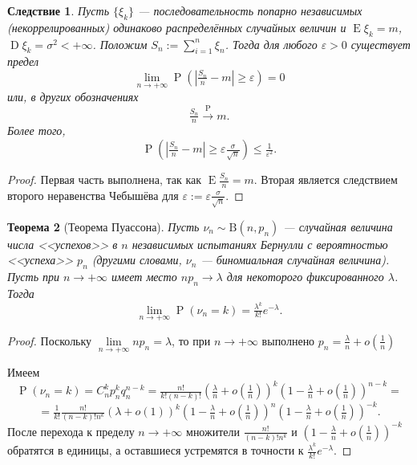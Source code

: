 \documentclass[12pt]{article}
\newtheorem{theorem}{Теорема}
\newtheorem{corollary}[theorem]{Следствие}
\numberwithin{theorem}{section}
\theoremstyle{definition}
\newcommand{\prob}{\operatorname{P}}
\newcommand{\expect}{\operatorname{E}}
\newcommand{\disp}{\operatorname{D}}
\begin{document}
	\begin{corollary}
		Пусть $ \{\xi_k\} $ --- последовательность попарно независимых (некоррелированных)
		одинаково распределённых случайных величин и $ \expect\xi_k = m $,
		$ \disp\xi_k = \sigma^2 < +\infty $. Положим $ S_n := \sum\limits_{i = 1}^{n} \xi_n $.
		Тогда для любого $ \varepsilon > 0 $ существует предел
		$$ \lim\limits_{n \to +\infty} \prob(|\tfrac{S_n}{n} - m| \geqslant \varepsilon) = 0 $$ 
		или, в других обозначениях 
		$$ \tfrac{S_n}{n} \overset{\prob}{\to} m. $$
		Более того,
		$$ \prob(|\tfrac{S_n}{n} - m| \geqslant \varepsilon\tfrac{\sigma}{\sqrt{n}}) \leqslant \tfrac{1}{\varepsilon^2}. $$
	\end{corollary}
	
	\begin{proof}
		Первая часть выполнена, так как $ \expect\tfrac{S_n}{n} = m $.
		Вторая является следствием второго неравенства Чебышёва
		для $ \varepsilon := \varepsilon\tfrac{\sigma}{\sqrt{n}} $.
	\end{proof}
	
	\begin{theorem}[Теорема Пуассона] \label{Poisson theorem}
		Пусть $ \nu_n \sim \mathrm{B}(n, p_n) $ --- случайная величина числа <<успехов>> в $ n $ независимых испытаниях Бернулли
		с вероятностью <<успеха>> $ p_n $ (другими словами, $ \nu_n $ --- биномиальная случайная величина).
		Пусть при $ n \to +\infty $ имеет место $ np_n \to \lambda $ для некоторого фиксированного $ \lambda $.
		Тогда
		$$ \lim\limits_{n \to + \infty} \prob(\nu_n = k) = \tfrac{\lambda^k}{k!}e^{-\lambda}. $$
	\end{theorem}
	
	\begin{proof}
		Поскольку $ \lim\limits_{n \to +\infty} np_n = \lambda $,
		то при $ n \to +\infty $ выполнено $ p_n =  \tfrac{\lambda}{n} + o(\tfrac{1}{n}) $
		
		Имеем 
		$$ \prob(\nu_n = k) = C_{n}^kp_n^kq_n^{n - k} 
		= \tfrac{n!}{k!(n - k)!}\left(\tfrac{\lambda}{n} + o(\tfrac{1}{n})\right)^k
		\left(1 - \tfrac{\lambda}{n} + o(\tfrac{1}{n})\right)^{n - k} = $$
		$$ = \tfrac{1}{k!} \tfrac{n!}{(n - k)!n^{k}}\left(\lambda + o(1)\right)^k
		\left(1 - \tfrac{\lambda}{n} + o(\tfrac{1}{n})\right)^{n}\left(1 - \tfrac{\lambda}{n} + o(\tfrac{1}{n})\right)^{-k}. $$
		После перехода к пределу $ n \to +\infty $
		множители $ \tfrac{n!}{(n - k)!n^{k}} $ и $ \left(1 - \tfrac{\lambda}{n} + o(\tfrac{1}{n})\right)^{-k} $
		обратятся в единицы, а оставшиеся устремятся в точности к $ \tfrac{\lambda^k}{k!}e^{-\lambda} $.
	\end{proof}
	
\end{document}
